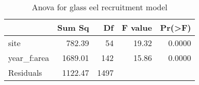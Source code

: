 \begin{table}[htbp]
\centering
\caption[table_anova]{Anova for glass eel recruitment model} 
\begin{tabularx}{0.8\textwidth}{lrrrr}
  \hline
 & Sum Sq & Df & F value & Pr(>F) \\ 
  \hline
site & 782.39 & 54 & 19.32 & 0.0000 \\ 
  year\_f:area & 1689.01 & 142 & 15.86 & 0.0000 \\ 
  Residuals & 1122.47 & 1497 &  &  \\ 
   \hline
\end{tabularx}
\end{table}
